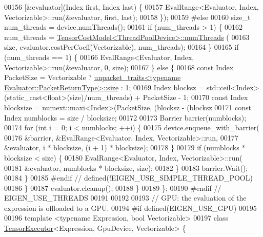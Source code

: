 \begin{DoxyCode}
{00156                          [&evaluator](Index first, Index last) \{
00157                            EvalRange<Evaluator, Index, Vectorizable>::run(&evaluator, first, last);
00158                          \});
00159 \textcolor{preprocessor}{#else}
00160       \textcolor{keywordtype}{size\_t} num\_threads = device.numThreads();
00161       \textcolor{keywordflow}{if} (num\_threads > 1) \{
00162         num\_threads = \hyperlink{class_eigen_1_1_tensor_cost_model}{TensorCostModel<ThreadPoolDevice>::numThreads}
      (
00163             size, evaluator.costPerCoeff(Vectorizable), num\_threads);
00164       \}
00165       \textcolor{keywordflow}{if} (num\_threads == 1) \{
00166         EvalRange<Evaluator, Index, Vectorizable>::run(&evaluator, 0, size);
00167       \} \textcolor{keywordflow}{else} \{
00168         \textcolor{keyword}{const} Index PacketSize = Vectorizable ? 
      \hyperlink{struct_eigen_1_1internal_1_1unpacket__traits}{unpacket\_traits<typename Evaluator::PacketReturnType>::size}
       : 1;
00169         Index blocksz = std::ceil<Index>(\textcolor{keyword}{static\_cast<}\textcolor{keywordtype}{float}\textcolor{keyword}{>}(size)/num\_threads) + PacketSize - 1;
00170         \textcolor{keyword}{const} Index blocksize = numext::maxi<Index>(PacketSize, (blocksz - (blocksz %
00171         \textcolor{keyword}{const} Index numblocks = size / blocksize;
00172 
00173         Barrier barrier(numblocks);
00174         \textcolor{keywordflow}{for} (\textcolor{keywordtype}{int} i = 0; i < numblocks; ++i) \{
00175           device.enqueue\_with\_barrier(
00176               &barrier, &EvalRange<Evaluator, Index, Vectorizable>::run,
00177               &evaluator, i * blocksize, (i + 1) * blocksize);
00178         \}
00179         \textcolor{keywordflow}{if} (numblocks * blocksize < size) \{
00180           EvalRange<Evaluator, Index, Vectorizable>::run(
00181               &evaluator, numblocks * blocksize, size);
00182         \}
00183         barrier.Wait();
00184       \}
00185 \textcolor{preprocessor}{#endif  // defined(!EIGEN\_USE\_SIMPLE\_THREAD\_POOL)}
00186     \}
00187     evaluator.cleanup();
00188   \}
00189 \};
00190 \textcolor{preprocessor}{#endif  // EIGEN\_USE\_THREADS}
00191 
00192 
00193 \textcolor{comment}{// GPU: the evaluation of the expression is offloaded to a GPU.}
00194 \textcolor{preprocessor}{#if defined(EIGEN\_USE\_GPU)}
00195 
00196 \textcolor{keyword}{template} <\textcolor{keyword}{typename} Expression, \textcolor{keywordtype}{bool} Vectorizable>
00197 \textcolor{keyword}{class }\hyperlink{class_eigen_1_1internal_1_1_tensor_executor}{TensorExecutor}<Expression, GpuDevice, Vectorizable> \{
}
\end{DoxyCode}

